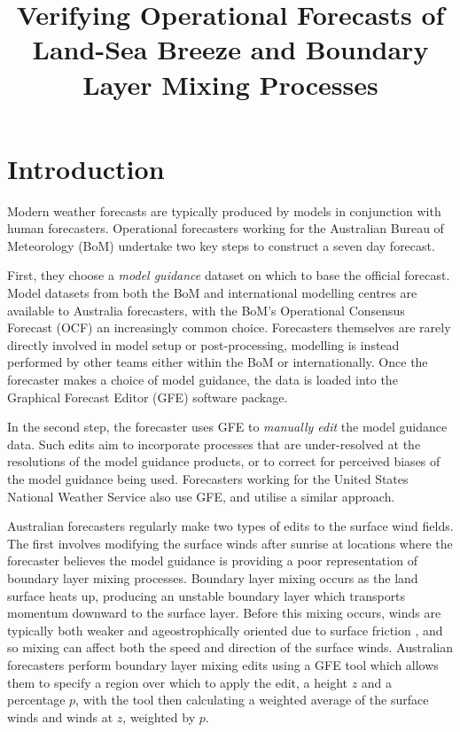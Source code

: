 \documentclass[twocol]{ametsoc}
\title{Verifying Operational Forecasts of Land-Sea Breeze and Boundary Layer Mixing Processes}
\affiliation{School of Earth Sciences, and ARC Centre of Excellence for Climate Extremes, The University of Melbourne, Melbourne, Victoria, Australia.}
\begin{document}
\maketitle

\section{Introduction}
\label{Sec:Introduction}
Modern weather forecasts are typically produced by models in conjunction with human forecasters. Operational forecasters working for the Australian Bureau of Meteorology (BoM) undertake two key steps to construct a seven day forecast. 

First, they choose a \textit{model guidance} dataset on which to base the official forecast. Model datasets from both the BoM and international modelling centres are available to Australia forecasters, with the BoM's Operational Consensus Forecast (OCF) an increasingly common choice. Forecasters themselves are rarely directly involved in model setup or post-processing, modelling is instead performed by other teams either within the BoM or internationally. Once the forecaster makes a choice of model guidance, the data is loaded into the Graphical Forecast Editor (GFE) software package. 

In the second step, the forecaster uses GFE to \textit{manually edit} the model guidance data. Such edits aim to incorporate processes that are under-resolved at the resolutions of the model guidance products, or to correct for perceived biases of the model guidance being used. Forecasters working for the United States National Weather Service also use GFE, and utilise a similar approach. 

Australian forecasters regularly make two types of edits to the surface wind fields. The first involves modifying the surface winds after sunrise at locations where the forecaster believes the model guidance is providing a poor representation of boundary layer mixing processes. Boundary layer mixing occurs as the land surface heats up, producing an unstable boundary layer which transports momentum downward to the surface layer. Before this mixing occurs, winds are typically both weaker and ageostrophically oriented due to surface friction \citep{lee18}, and so mixing can affect both the speed and direction of the surface winds. Australian forecasters perform boundary layer mixing edits using a GFE tool which allows them to specify a region over which to apply the edit, a height $z$ and a percentage $p$, with the tool then calculating a weighted average of the surface winds and winds at $z$, weighted by $p$.
\end{document}
